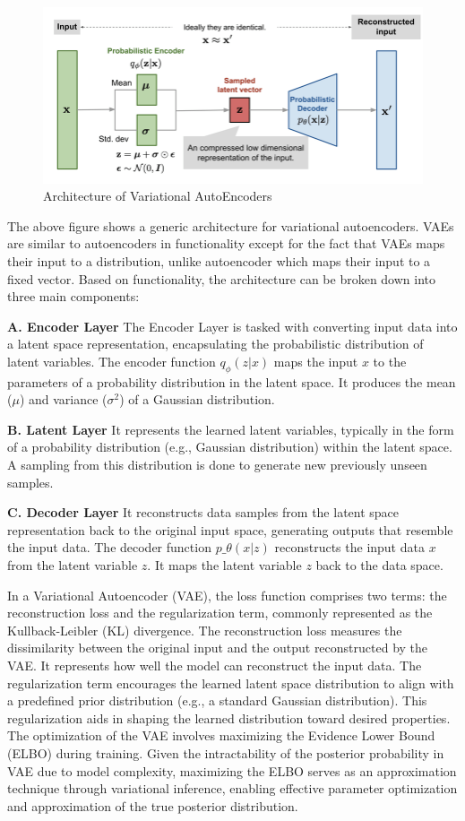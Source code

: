\documentclass[12pt]{article}
\begin{document}
\begin{figure}[!h]
    \centering
    \includegraphics[width=0.75\linewidth]{figures/vae-arch.jpg}
    \caption{Architecture of Variational AutoEncoders \cite{Weng2018From}}
    \label{fig:enter-label}
\end{figure}

The above figure shows a generic architecture for variational autoencoders. VAEs are similar to autoencoders in functionality except for the fact that VAEs maps their input to a distribution, unlike autoencoder which maps their input to a fixed vector. Based on functionality, the architecture can be broken down into three main components:

\textbf{A. Encoder Layer}
The Encoder Layer is tasked with converting input data into a latent space representation, encapsulating the probabilistic distribution of latent variables. The encoder function \(q_\phi(z|x)\) maps the input \(x\) to the parameters of a probability distribution in the latent space. It produces the mean (\(\mu\)) and variance (\(\sigma^2\)) of a Gaussian distribution.

\textbf{B. Latent Layer}
It represents the learned latent variables, typically in the form of a probability distribution (e.g., Gaussian distribution) within the latent space. A sampling from this distribution is done to generate new previously unseen samples.

\textbf{C. Decoder Layer}
It reconstructs data samples from the latent space representation back to the original input space, generating outputs that resemble the input data. The decoder function \(p\_\theta(x|z)\) reconstructs the input data \(x\) from the latent variable \(z\). It maps the latent variable \(z\) back to the data space.

In a Variational Autoencoder (VAE), the loss function comprises two terms: the reconstruction loss and the regularization term, commonly represented as the Kullback-Leibler (KL) divergence. The reconstruction loss measures the dissimilarity between the original input and the output reconstructed by the VAE. It represents how well the model can reconstruct the input data. The regularization term encourages the learned latent space distribution to align with a predefined prior distribution (e.g., a standard Gaussian distribution). This regularization aids in shaping the learned distribution toward desired properties. The optimization of the VAE involves maximizing the Evidence Lower Bound (ELBO) during training. Given the intractability of the posterior probability in VAE due to model complexity, maximizing the ELBO serves as an approximation technique through variational inference, enabling effective parameter optimization and approximation of the true posterior distribution. \cite{Foster2023-yo}
\end{document}
